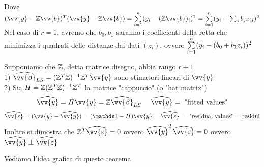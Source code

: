 Dove $(\vv{y}-\ZZ\vv{b})^T(\vv{y}-\ZZ\vv{b}) = \Sum{i=1}{n} (y_i-(\ZZ\vv{b})_i)^2 = \Sum{i=1}{n} (y_i-\sum_j b_j z_{ij})^2$\\

Nel caso di $r=1$, avremo che $b_0,b_1$ saranno i coefficienti della retta che minimizza i quadrati delle distanze dai dati $(z_i)$, ovvero $\sum\limits_{i=1}^{n} (y_i-(b_0+b_1z_i))^2$\\




\begin{teo}
Supponiamo che $\mathbb Z$, detta matrice disegno, abbia rango $r+1$\\
1) $\hat{\vv{\beta}}_{LS}= (\ZZ^T\ZZ)^{-1}\ZZ^T\vv{y}$ sono stimatori lineari di $\vv{y} $\\
2) Sia $H= \mathbb Z(\mathbb Z^T\mathbb Z)^{-1}\mathbb Z^T$ la matrice "cappuccio" (o "hat matrix")
\[
\hat{\vv{y}}=H\vv{y}=\ZZ\hat{\vv{\beta}}_{LS} \ \ \ \ \hat{\vv{y}} = \text{ "fitted values"}
\]
\[
\hat{\vv{\eps}}=(\vv{y}-\hat{\vv{y}})=(\II - H )\vv{y} \ \ \ \ \hat{\vv{\eps}}=\text{ "residual values" = residui}
\]
Inoltre si dimostra che $\ZZ^T\hat{\vv{\eps}}=0 $ ovvero $ \hat{\vv{y}}^T\hat{\vv{\eps}}=0 $ ovvero $
\hat{\vv{y}}\perp \hat{\vv{\eps}}$ 
\end{teo}
Vediamo l'idea grafica di questo teorema

